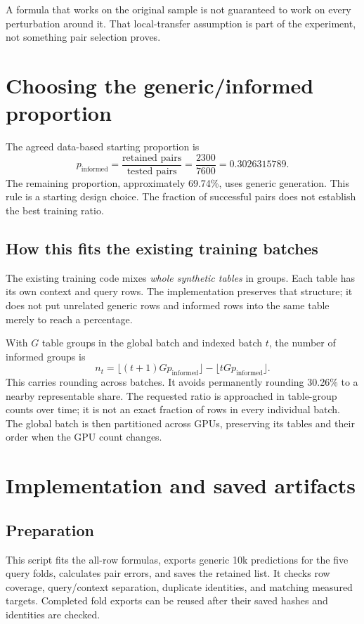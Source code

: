 \documentclass[11pt]{article}
\begin{document}
A formula that works on the original sample is not guaranteed to work on every
perturbation around it. That local-transfer assumption is part of the experiment,
not something pair selection proves.

\section{Choosing the generic/informed proportion}
The agreed data-based starting proportion is
\begin{equation}
 p_{\mathrm{informed}}=
 \frac{\text{retained pairs}}{\text{tested pairs}}
 =\frac{2300}{7600}=0.3026315789.
\end{equation}
The remaining proportion, approximately 69.74\%, uses generic generation.
This rule is a starting design choice. The fraction of successful pairs does
not establish the best training ratio.

\subsection{How this fits the existing training batches}
The existing training code mixes \emph{whole synthetic tables} in groups. Each
table has its own context and query rows. The implementation preserves that
structure; it does not put unrelated generic rows and informed rows into the
same table merely to reach a percentage.

With $G$ table groups in the global batch and indexed batch $t$, the number of informed
groups is
\begin{equation}
 n_t=\lfloor(t+1)G p_{\mathrm{informed}}\rfloor
      -\lfloor tG p_{\mathrm{informed}}\rfloor.
\end{equation}
This carries rounding across batches. It avoids permanently rounding 30.26\%
to a nearby representable share. The requested ratio is approached in table-group
counts over time; it is not an exact fraction of rows in every individual batch.
The global batch is then partitioned across GPUs, preserving its tables and
their order when the GPU count changes.

\section{Implementation and saved artifacts}
\subsection{Preparation}
\begin{quote}\small
{}
\end{quote}
This script fits the all-row formulas, exports generic 10k predictions for the
five query folds, calculates pair errors, and saves the retained list.
It checks row coverage, query/context separation, duplicate identities, and
matching measured targets. Completed fold exports can be reused after their
saved hashes and identities are checked.
\end{document}
